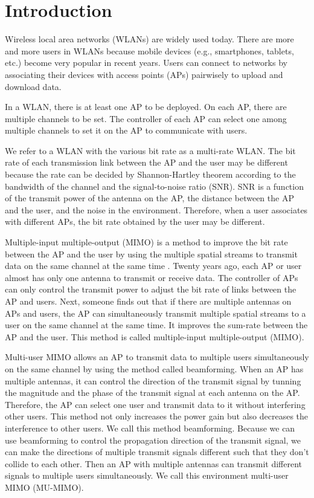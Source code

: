 \section{Introduction}
	Wireless local area networks (WLANs) are widely used today. There are more and more users in WLANs because mobile devices (e.g., smartphones, tablets, etc.) become very popular in recent years. Users can connect to networks by associating their devices with access points (APs) pairwisely to upload and download data.
	
	In a WLAN, there is at least one AP to be deployed. On each AP, there are multiple channels to be set. The controller of each AP can select one among multiple channels to set it on the AP to communicate with users.
	
	We refer to a WLAN with the various bit rate as a multi-rate WLAN. The bit rate of each transmission link between the AP and the user may be different because the rate can be decided by Shannon-Hartley theorem according to the bandwidth of the channel and the signal-to-noise ratio (SNR). SNR is a function of the transmit power of the antenna on the AP, the distance between the AP and the user, and the noise in the environment. Therefore, when a user associates with different APs, the bit rate obtained by the user may be different. 
	
	Multiple-input multiple-output (MIMO) is a method to improve the bit rate between the AP and the user by using the multiple spatial streams to transmit data on the same channel at the same time \cite{li2002mimo}. Twenty years ago, each AP or user almost has only one antenna to transmit or receive data. The controller of APs can only control the transmit power to adjust the bit rate of links between the AP and users. Next, someone finds out that if there are multiple antennas on APs and users, the AP can simultaneously transmit multiple spatial streams to a user on the same channel at the same time. It improves the sum-rate between the AP and the user. This method is called multiple-input multiple-output (MIMO).
	
	Multi-user MIMO allows an AP to transmit data to multiple users simultaneously on the same channel by using the method called beamforming. When an AP has multiple antennas, it can control the direction of the transmit signal by tunning the magnitude and the phase of the transmit signal at each antenna on the AP. Therefore, the AP can select one user and transmit data to it without interfering other users. This method not only increases the power gain but also decreases the interference to other users. We call this method beamforming.
	Because we can use beamforming to control the propagation direction of the transmit signal, we can make the directions of multiple transmit signals different such that they don't collide to each other. Then an AP with multiple antennas can transmit different signals to multiple users simultaneously. We call this environment  multi-user MIMO (MU-MIMO).
	
